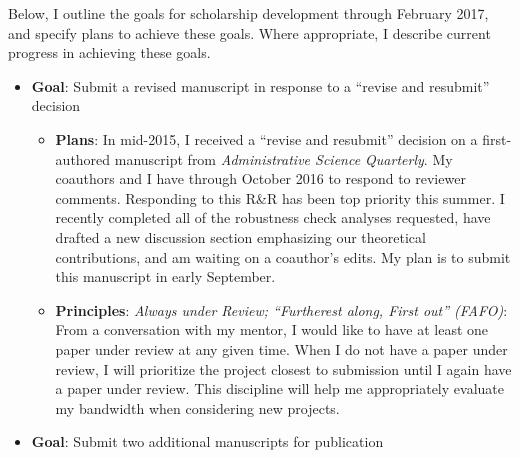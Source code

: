 \documentclass[11pt,article,oneside]{memoir}
\begin{document}
Below, I outline the goals for scholarship development through February
2017, and specify plans to achieve these goals. Where appropriate, I
describe current progress in achieving these goals.

\begin{itemize}
\tightlist
\item
  \textbf{Goal}: Submit a revised manuscript in response to a
  \enquote{revise and resubmit} decision

  \begin{itemize}
  \tightlist
  \item
    \textbf{Plans}: In mid-2015, I received a \enquote{revise and
    resubmit} decision on a first-authored manuscript from
    \emph{Administrative Science Quarterly}. My coauthors and I have
    through October 2016 to respond to reviewer comments. Responding to
    this R\&R has been top priority this summer. I recently completed
    all of the robustness check analyses requested, have drafted a new
    discussion section emphasizing our theoretical contributions, and am
    waiting on a coauthor's edits. My plan is to submit this manuscript
    in early September.
  \item
    \textbf{Principles}: \emph{Always under Review; \enquote{Furtherest
    along, First out} (FAFO)}: From a conversation with my mentor, I
    would like to have at least one paper under review at any given
    time. When I do not have a paper under review, I will prioritize the
    project closest to submission until I again have a paper under
    review. This discipline will help me appropriately evaluate my
    bandwidth when considering new projects.
  \end{itemize}
\item
  \textbf{Goal}: Submit two additional manuscripts for publication


\end{itemize}
\end{document}

